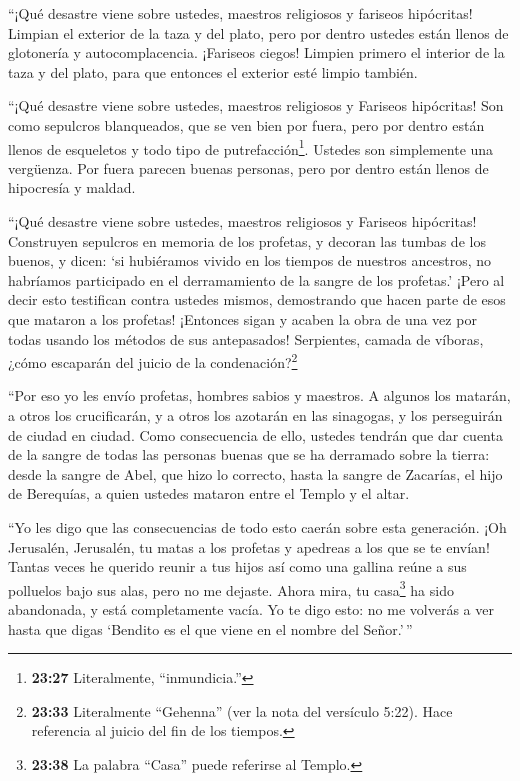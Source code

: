  ``¡Qué desastre viene sobre ustedes, maestros religiosos y
fariseos hipócritas! Limpian el exterior de la taza y del plato, pero
por dentro ustedes están llenos de glotonería y autocomplacencia.
 ¡Fariseos ciegos! Limpien primero el interior de la taza y
del plato, para que entonces el exterior esté limpio también.

 ``¡Qué desastre viene sobre ustedes, maestros religiosos y
Fariseos hipócritas! Son como sepulcros blanqueados, que se ven bien por
fuera, pero por dentro están llenos de esqueletos y todo tipo de
putrefacción\footnote{\textbf{23:27} Literalmente, ``inmundicia.''}.
 Ustedes son simplemente una vergüenza. Por fuera parecen
buenas personas, pero por dentro están llenos de hipocresía y maldad.

 ``¡Qué desastre viene sobre ustedes, maestros religiosos y
Fariseos hipócritas! Construyen sepulcros en memoria de los profetas, y
decoran las tumbas de los buenos,  y dicen: `si hubiéramos
vivido en los tiempos de nuestros ancestros, no habríamos participado en
el derramamiento de la sangre de los profetas.'  ¡Pero al
decir esto testifican contra ustedes mismos, demostrando que hacen parte
de esos que mataron a los profetas!  ¡Entonces sigan y
acaben la obra de una vez por todas usando los métodos de sus
antepasados!  Serpientes, camada de víboras, ¿cómo
escaparán del juicio de la condenación?\footnote{\textbf{23:33}
  Literalmente ``Gehenna'' (ver la nota del versículo 5:22). Hace
  referencia al juicio del fin de los tiempos.}

 ``Por eso yo les envío profetas, hombres sabios y
maestros. A algunos los matarán, a otros los crucificarán, y a otros los
azotarán en las sinagogas, y los perseguirán de ciudad en ciudad.
 Como consecuencia de ello, ustedes tendrán que dar cuenta
de la sangre de todas las personas buenas que se ha derramado sobre la
tierra: desde la sangre de Abel, que hizo lo correcto, hasta la sangre
de Zacarías, el hijo de Berequías, a quien ustedes mataron entre el
Templo y el altar.

 ``Yo les digo que las consecuencias de todo esto caerán
sobre esta generación.  ¡Oh Jerusalén, Jerusalén, tu matas
a los profetas y apedreas a los que se te envían! Tantas veces he
querido reunir a tus hijos así como una gallina reúne a sus polluelos
bajo sus alas, pero no me dejaste.  Ahora mira, tu
casa\footnote{\textbf{23:38} La palabra ``Casa'' puede referirse al
  Templo.} ha sido abandonada, y está completamente vacía. 
Yo te digo esto: no me volverás a ver hasta que digas `Bendito es el que
viene en el nombre del Señor.'\,''

